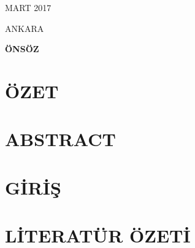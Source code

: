 \documentclass[11pt]{article}
\begin{document}
\bigskip





\begin{center}
{\Large MART 2017

\vspace{1mm}
ANKARA}
\end{center}


\linespread{1.5}

\newpage\setlength{\parskip}{3mm} 
\onehalfspacing
\bigskip
{}
\setcounter{page}{1}

\begin{center}

  
{\LARGE \bf ÖNSÖZ}
\end{center}


\newpage

\setlength{\parskip}{1mm} 

\tableofcontents
\listoffigures
\listoftables



\newpage \setlength{\parskip}{3mm}
\phantom{ss}
\vspace{-2.5cm}
\sectionfont{\centering}

\section*{ÖZET}



\newpage
\section*{ABSTRACT}


\newpage


\renewcommand{\thesection}{\arabic{section}.}
\renewcommand{\thesubsection} {\thesection\arabic{subsection}.}
\renewcommand{\thesubsubsection}{\thesubsection\arabic{subsubsection}.}


\setcounter{page}{1}


\section{GİRİŞ}



\clearpage
\section {LİTERATÜR ÖZETİ}
\end{document}
